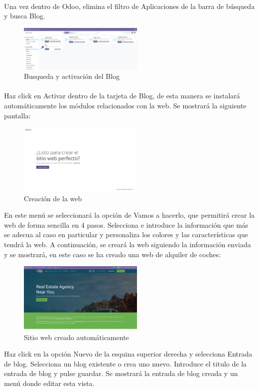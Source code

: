 \documentclass[paper=a4wide, fontsize=11pt]{report}	 %
\begin{document}
\paragraph{}
Una vez dentro de Odoo, elimina el filtro de Aplicaciones de la barra de búsqueda y busca Blog.
\begin{figure}[h]
    \centering
    \includegraphics[width=6cm]{blog.png}
    \caption{Busqueda y activación del Blog}
    \label{fig:blog}
\end{figure}
\paragraph{}
Haz click en Activar dentro de la tarjeta de Blog, de esta manera se instalará automáticamente los módulos relacionados con la web. Se mostrará la siguiente pantalla:
\begin{figure}[h]
    \centering
    \includegraphics[width=6cm]{tutorial.png}
    \caption{Creación de la web}
    \label{fig:tutorial}
\end{figure}
En este menú se seleccionará la opción de Vamos a hacerlo, que permitirá crear la web de forma sencilla en 4 pasos. Selecciona e introduce la información que más se adecua al caso en particular y personaliza los colores y las características que tendrá la web. A continuación, se creará la web siguiendo la información enviada y se mostrará, en este caso se ha creado una web de alquiler de coches:
\begin{figure}[h]
    \centering
    \includegraphics[width=6cm]{web.png}
    \caption{Sitio web creado automáticamente}
    \label{fig:web}
\end{figure}
Haz click en la opción Nuevo de la esquina superior derecha y selecciona Entrada de blog. Selecciona un blog existente o crea uno nuevo. Introduce el titulo de la entrada de blog y pulse guardar. Se mostrará la entrada de blog creada y un menú donde editar esta vista.
\end{document}
